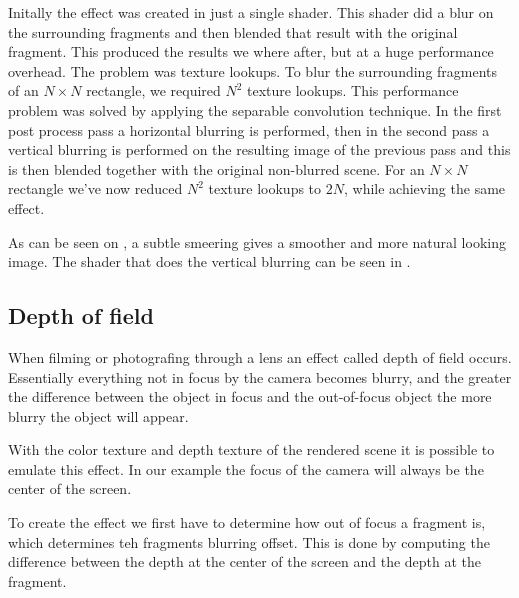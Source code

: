 Initally the effect was created in just a single shader. This shader
did a blur on the surrounding fragments and then blended that result
with the original fragment. This produced the results we where after,
but at a huge performance overhead. The problem was texture
lookups. To blur the surrounding fragments of an $N \times N$
rectangle, we required $N^2$ texture lookups. This performance problem
was solved by applying the separable convolution technique. In the
first post process pass a horizontal blurring is performed, then in
the second pass a vertical blurring is performed on the resulting
image of the previous pass and this is then blended together with the
original non-blurred scene. For an $N \times N$ rectangle we've now
reduced $N^2$ texture lookups to $2N$, while achieving the same
effect.


As can be seen on , a subtle smeering gives a
smoother and more natural looking image. The shader that does the
vertical blurring can be seen in .




\subsection{Depth of field}

When filming or photografing through a lens an effect called depth of
field occurs. Essentially everything not in focus by the camera
becomes blurry, and the greater the difference between the object in
focus and the out-of-focus object the more blurry the object will
appear.

With the color texture and depth texture of the rendered scene it is
possible to emulate this effect. In our example the focus of the
camera will always be the center of the screen.

To create the effect we first have to determine how out of focus a
fragment is, which determines teh fragments blurring offset. This is
done by computing the difference between the depth at the center of
the screen and the depth at the fragment.

